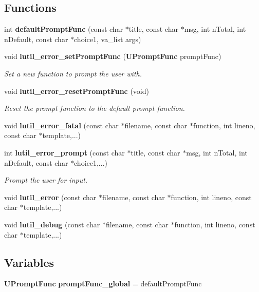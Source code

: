 \subsection*{Functions}
\begin{CompactItemize}
\item 
int {\bf default\-Prompt\-Func} (const char $\ast$title, const char $\ast$msg, int n\-Total, int n\-Default, const char $\ast$choice1, va\_\-list args)
\item 
void {\bf lutil\_\-error\_\-set\-Prompt\-Func} ({\bf UPrompt\-Func} prompt\-Func)
\begin{CompactList}\small\item\em Set a new function to prompt the user with. \item\end{CompactList}\item 
void {\bf lutil\_\-error\_\-reset\-Prompt\-Func} (void)
\begin{CompactList}\small\item\em Reset the prompt function to the default prompt function. \item\end{CompactList}\item 
void {\bf lutil\_\-error\_\-fatal} (const char $\ast$filename, const char $\ast$function, int lineno, const char $\ast$template,...)
\item 
int {\bf lutil\_\-error\_\-prompt} (const char $\ast$title, const char $\ast$msg, int n\-Total, int n\-Default, const char $\ast$choice1,...)
\begin{CompactList}\small\item\em Prompt the user for input. \item\end{CompactList}\item 
void {\bf lutil\_\-error} (const char $\ast$filename, const char $\ast$function, int lineno, const char $\ast$template,...)
\item 
void {\bf lutil\_\-debug} (const char $\ast$filename, const char $\ast$function, int lineno, const char $\ast$template,...)
\end{CompactItemize}
\subsection*{Variables}
\begin{CompactItemize}
\item 
{\bf UPrompt\-Func} {\bf prompt\-Func\_\-global} = default\-Prompt\-Func
\end{CompactItemize}


